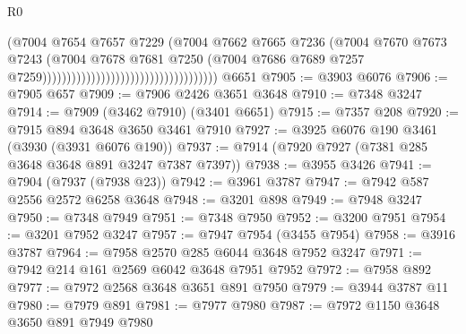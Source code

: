 \begin{lexlean}{R0}
\begin{coremodule}
                                                                  (@7004
                                                                    @7654
                                                                    @7657
                                                                    @7229
                                                                    (@7004
                                                                      @7662
                                                                      @7665
                                                                      @7236
                                                                      (@7004
                                                                        @7670
                                                                        @7673
                                                                        @7243
                                                                        (@7004
                                                                          @7678
                                                                          @7681
                                                                          @7250
                                                                          (@7004
                                                                            @7686
                                                                            @7689
                                                                            @7257
                                                                            @7259))))))))))))))))))))))))))))))))))))
    @6651
@7905 := @3903 @6076
@7906 := @7905 @657
@7909 := @7906 @2426 @3651 @3648
@7910 := @7348 @3247
@7914 := @7909 (@3462 @7910) (@3401 @6651)
@7915 := @7357 @208
@7920 := @7915 @894 @3648 @3650 @3461 @7910
@7927 := @3925 @6076 @190 @3461 (@3930 (@3931 @6076 @190))
@7937 := @7914 (@7920 @7927 (@7381 @285 @3648 @3648 @891 @3247 @7387 @7397))
@7938 := @3955 @3426
@7941 := @7904 (@7937 (@7938 @23))
@7942 := @3961 @3787
@7947 := @7942 @587 @2556 @2572 @6258 @3648
@7948 := @3201 @898
@7949 := @7948 @3247
@7950 := @7348 @7949
@7951 := @7348 @7950
@7952 := @3200 @7951
@7954 := @3201 @7952 @3247
@7957 := @7947 @7954 (@3455 @7954)
@7958 := @3916 @3787
@7964 := @7958 @2570 @285 @6044 @3648 @7952 @3247
@7971 := @7942 @214 @161 @2569 @6042 @3648 @7951 @7952
@7972 := @7958 @892
@7977 := @7972 @2568 @3648 @3651 @891 @7950
@7979 := @3944 @3787 @11
@7980 := @7979 @891
@7981 := @7977 @7980
@7987 := @7972 @1150 @3648 @3650 @891 @7949 @7980

\end{coremodule}
\end{lexlean}
